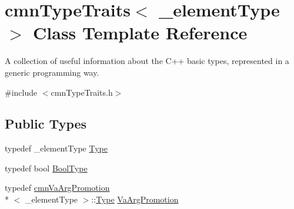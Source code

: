 \hypertarget{classcmn_type_traits}{\section{cmn\-Type\-Traits$<$ \-\_\-element\-Type $>$ Class Template Reference}
\label{classcmn_type_traits}
}


A collection of useful information about the C++ basic types, represented in a generic programming way.  




{\ttfamily \#include $<$cmn\-Type\-Traits.\-h$>$}

\subsection*{Public Types}
\begin{DoxyCompactItemize}
\item 
typedef \-\_\-element\-Type \hyperlink{classcmn_type_traits_aefe66f235207b010b396b5558529a1da}{Type}
\item 
typedef bool \hyperlink{classcmn_type_traits_aaa41087228a7f165bcd9f4385e644e28}{Bool\-Type}
\item 
typedef \hyperlink{classcmn_va_arg_promotion}{cmn\-Va\-Arg\-Promotion}\\*
$<$ \-\_\-element\-Type $>$\-::\hyperlink{classcmn_type_traits_aefe66f235207b010b396b5558529a1da}{Type} \hyperlink{classcmn_type_traits_a824cf785b2d249f59bf5d9f03c6e8049}{Va\-Arg\-Promotion}
\end{DoxyCompactItemize}
